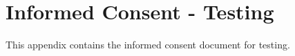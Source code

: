 %
%
%                 

\chapter{Informed Consent - Testing}
\label{sec:appendixh}

This appendix contains the informed consent document for testing. 



